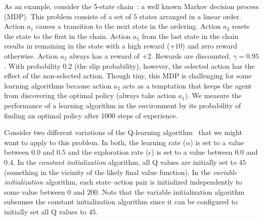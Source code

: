 As an example, consider the 5-state chain~\cite{strens2000bayesian}: a well known Markov decision process (MDP).
This problem consists of a set of 5 states arranged in a linear order. Action $a_1$ causes a transition to the next state in the ordering. Action $a_2$ resets the state to the first in the chain. Action $a_1$ from the last state in the chain results in remaining in the state with a high reward ($+10$) and zero reward otherwise. Action $a_2$ always has a reward of $+2$. Rewards are discounted, $\gamma=0.95$. With probability $0.2$ (the slip probability), however, the selected action has the effect of the non-selected action. Though tiny, this MDP is challenging for some learning algorithms because action $a_2$ acts as a temptation that keeps the agent from discovering the optimal policy (always take action $a_1$). We measure the performance of a learning algorithm in the environment by its probability of finding an optimal policy after 1000 steps of experience. 

Consider two different variations of the Q-learning algorithm~\cite{sutton1998reinforcement} that we might want to apply to this problem. In both, the learning rate ($\alpha$) is set to a value between $0.0$ and $0.5$ and the exploration rate ($\epsilon$) is set to a value between $0.0$ and $0.4$.
In the \emph{constant initialization} algorithm, all Q values are initially set to %
$45$ (something in the vicinity of the likely final value function).
In the \emph{variable initialization} algorithm, each state--action pair is initialized independently to some value between $0$ and $200$. Note that the variable initialization algorithm subsumes the constant initialization algorithm since it can be configured to initially set all Q values to 
$45$.

